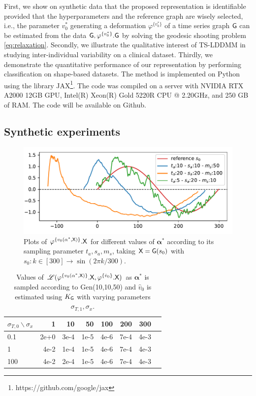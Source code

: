 First, we show on synthetic data that the proposed representation is identifiable provided that the hyperparameters and the reference graph are wisely selected, i.e.,
 the parameter $v_0^*$ generating a deformation $\varphi^{\{v_0^*\}}$ of a time series graph $\mathsf{G}$ can be estimated from the data $\mathsf{G},\varphi^{\{v_0^*\}}.\mathsf{G}$ by solving the geodesic shooting problem \eqref{eq:relaxation}.
 Secondly, we illustrate the qualitative interest of TS-LDDMM in studying inter-individual variability on a clinical dataset.
  Thirdly, we demonstrate the quantitative performance of our representation by performing classification on shape-based datasets.
  The method is implemented on Python using the library JAX\footnote{https://github.com/google/jax}. The code was compiled on a server with NVIDIA RTX A2000 12GB GPU, Intel(R) Xeon(R) Gold 5220R CPU @ 2.20GHz, and 250 GB of RAM. The code will be available on Github.
\subsection{Synthetic experiments}
\begin{figure}[t]
    \centering
    \includegraphics[width=0.5\linewidth]{pictures/samples.pdf}
    \vspace{-2.5em}
    \caption{Plots of $\varphi^{\{v_0(\mathbf{\alpha}^*,\mathsf{X})\}}.\mathsf{X}$ for different values of $\mathbf{\alpha}^*$ according to its sampling parameter $t_a,s_a,m_s $, taking $\mathsf{X}=\mathsf{G}(s_0)$ with $s_0:k\in [300]\to \sin(2\pi k/300) $.}
    \label{fig:exemple_synthetic}
    \vspace{-1em}
\end{figure}

\begin{table}
    \caption{Values of $\mathscr{L}(\varphi^{\{v_0(\mathbf{\alpha}^*,\mathsf{X})\}}.\mathsf{X},\varphi^{\{\hat{v}_0\}}.\mathsf{X})$ as $\mathbf{\alpha}^*$ is sampled according to Gen(10,10,50) and $\hat{v}_0$ is estimated using $K_{\mathsf{G}}$ with varying parameters $\sigma_{T,1},\sigma_x$.}
      \centering
         \begin{tabular}{lrrrrrrr}
         \toprule
         $\sigma_{T,0} \backslash \sigma_x$  & 1 & 10 & 50 & 100 & 200 & 300 \\
         \midrule
         0.1 & 2e+0 & 3e-4  & 1e-5&4e-6&7e-4&4e-3 \\
        1 & 4e-2 & 1e-4  & 1e-5&4e-6&7e-4 &4e-3  \\
         100 & 4e-2 & 2e-4  & 1e-5&4e-6&7e-4&4e-3  \\
         \bottomrule
         \end{tabular}
      \label{table:synthetic2}
      \vspace{-1em}
  \end{table}
 


